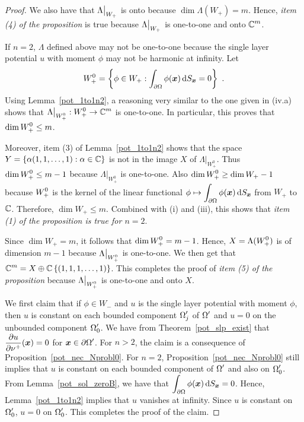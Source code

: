 \begin{proof}
We also have that $\displaystyle \Lambda\big|_{W_+}$ is onto because
$\dim \Lambda(W_+) = m$.  Hence, {\em item (4) of the proposition} is
true because $\displaystyle \Lambda\big|_{W_+}$ is one-to-one and onto
$\displaystyle \mathbb{C}^m$.

  If $n=2$, $\Lambda$ defined above may not be one-to-one
because the single layer potential $u$ with moment $\phi$ may not be
harmonic at infinity.  Let
\[
W_+^0 = \left\{ \phi \in W_+ : \int_{\partial \Omega} \phi({\bm{x}})
\,\mathrm{d}{S}_{{\bm{x}}} = 0 \right\} \ .
\]
Using Lemma~\ref{pot_1to1n2}, a reasoning very similar to the one
given in (iv.a) shows that
$\displaystyle \Lambda\big|_{W_+^0} : W_+^0 \rightarrow \mathbb{C}^m$ is
one-to-one.  In particular, this proves that $\displaystyle \dim W_+^0 \leq m$.

Moreover, item (3) of Lemma~\ref{pot_1to1n2} shows that the space
$\displaystyle Y = \left\{ \alpha (1,1,\ldots,1) : \alpha \in \mathbb{C} \right\}$
is not in the image $X$ of $\Lambda\big|_{W_+^0}$.
Thus $\displaystyle \dim W_+^0 \leq m-1$ because
$\Lambda\big|_{W_+^0}$ is one-to-one.
Also $\displaystyle \dim W_+^0 \geq \dim W_+ - 1$ because
$\displaystyle W_+^0$ is the kernel of the
linear functional
$\displaystyle \phi \mapsto \int_{\partial \Omega} \phi({\bm{x}}) \,\mathrm{d}{S}_{{\bm{x}}}$
from $W_+$ to $\mathbb{C}$.
Therefore, $\dim W_+ \leq m$.  Combined with (i) and (iii), this shows
that {\em item (1) of the proposition is true for $n=2$}.

Since $\dim W_+ = m$, it follows that $\displaystyle \dim W_+^0 = m - 1$.
Hence, $\displaystyle X = \Lambda(W_+^0)$ is of dimension $m-1$ because
$\displaystyle \Lambda\big|_{W_+^0}$ is one-to-one.
We then get that
$\displaystyle \mathbb{C}^m = X \oplus \mathbb{C}\left\{(1,1,1,\ldots,1)\right\}$.
This completes the proof of {\em item (5) of the proposition} because
$\displaystyle \Lambda\big|_{W_+^0}$ is one-to-one and onto $X$.

We first claim that if $\phi \in W_-$ and $u$ is the single layer
potential with moment $\phi$, then $u$ is constant on each bounded
component $\displaystyle \Omega_j^{\prime}$ of
$\displaystyle \Omega^{\prime}$ and $u=0$ on the unbounded
component $\displaystyle \Omega_0^{\prime}$.  We have from
Theorem~\ref{pot_slp_exist}
that $\displaystyle \frac{\partial{u}}{\partial \nu^+}({\bm{x}}) = 0$
for $\displaystyle {\bm{x}} \in \partial \Omega^{\prime}$.  For $n>2$,
the claim is a consequence of Proposition~\ref{pot_nec_Nprobl0}.  For $n=2$,
Proposition~\ref{pot_nec_Nprobl0} still implies that $u$ is constant
on each bounded component of $\displaystyle \Omega^{\prime}$ and also
on $\displaystyle \Omega_0^{\prime}$.
From Lemma~\ref{pot_sol_zeroB}, we have that
$\displaystyle \int_{\partial \Omega} \phi({\bm{x}}) \,\mathrm{d}{S}_{{\bm{x}}} = 0$.
Hence, Lemma~\ref{pot_1to1n2} implies that $u$ vanishes at infinity.  Since
$u$ is constant on $\displaystyle \Omega_0^{\prime}$, $u=0$ on
$\displaystyle \Omega_0^{\prime}$.
This completes the proof of the claim.


\end{proof}
